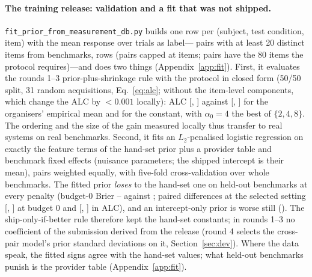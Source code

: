 \documentclass{article}
\begin{document}
\paragraph{The training release: validation and a fit that was not shipped.} \texttt{fit\_prior\_from\_measurement\_db.py} builds one row per (subject, test condition, item) with the mean response over trials as label---\FitNPairs{} pairs with at least 20 distinct items from \FitNBench{} benchmarks, \FitNRows{} rows (pairs capped at \FitMaxItemsPerPair{} items; \FitRelNPairsAlc{} pairs have the 80 items the protocol requires)---and does two things (Appendix~\ref{app:fit}). First, it evaluates the rounds 1--3 prior-plus-shrinkage rule with the protocol in closed form (50/50 split, 31 random acquisitions, Eq.~\ref{eq:alc}; without the item-level components, which change the ALC by $<0.001$ locally): ALC \FitRelHandAlc{} [\FitRelHandAlcLo, \FitRelHandAlcHi] against \FitRelEmpAlc{} [\FitRelEmpAlcLo, \FitRelEmpAlcHi] for the organisers' empirical mean and \FitRelConstAlc{} for the constant, with $\alpha_0=4$ the best of $\{2,4,8\}$. The ordering and the size of the gain measured locally thus transfer to real systems on real benchmarks. Second, it fits an $L_2$-penalised logistic regression on exactly the feature terms of the hand-set prior plus a provider table and benchmark fixed effects (nuisance parameters; the shipped intercept is their mean), pairs weighted equally, with five-fold cross-validation over whole benchmarks. The fitted prior \emph{loses} to the hand-set one on held-out benchmarks at every penalty (budget-0 Brier \FitCMinBZero{}--\FitCMaxBZero{} against \FitRelHandBZero; paired differences at the selected setting \FitPairBZeroMean{} [\FitPairBZeroLo, \FitPairBZeroHi] at budget 0 and \FitPairAlcMean{} [\FitPairAlcLo, \FitPairAlcHi] in ALC), and an intercept-only prior is worse still (\FitRelIntOnlyBZero). The ship-only-if-better rule therefore kept the hand-set constants; in rounds 1--3 no coefficient of the submission derived from the release (round 4 selects the cross-pair model's prior standard deviations on it, Section~\ref{sec:dev}). Where the data speak, the fitted signs agree with the hand-set values; what held-out benchmarks punish is the provider table (Appendix~\ref{app:fit}).
\end{document}
